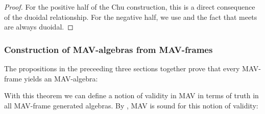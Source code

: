 \begin{proof}
  For the positive half of the Chu construction, this is a direct
  consequence of the duoidal relationship. For the negative half, we
  use  and the fact that meets are
  always duoidal.
\end{proof}

\subsubsection{Construction of MAV-algebras from MAV-frames}
\label{sec:algebra-from-frame}

The propositions in the preceeding three sections together prove that
every MAV-frame yields an MAV-algebra:


With this theorem we can define a notion of validity in MAV in terms
of truth in all MAV-frame generated algebras. By ,
MAV is sound for this notion of validity:

